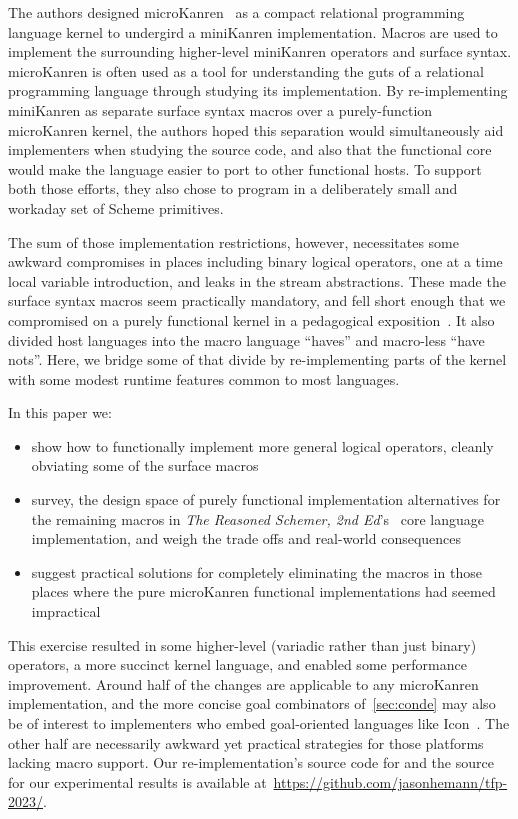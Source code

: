 \documentclass[sigplan,draft,balance,pbalance,natbib=false]{acmart}
\begin{document}
The authors designed microKanren~\cite{hemann2013muKanren} as a
compact relational programming language kernel to undergird a
miniKanren implementation. Macros are used to implement the
surrounding higher-level miniKanren operators and surface syntax.\@
microKanren is often used as a tool for understanding the guts of a
relational programming language through studying its implementation.
By re-implementing miniKanren as separate surface syntax macros over a
purely-function microKanren kernel, the authors hoped this separation
would simultaneously aid implementers when studying the source code,
and also that the functional core would make the language easier to
port to other functional hosts. To support both those efforts, they
also chose to program in a deliberately small and workaday set of
Scheme primitives.

The sum of those implementation restrictions, however, necessitates
some awkward compromises in places including binary logical operators,
one at a time local variable introduction, and leaks in the stream
abstractions. These made the surface syntax macros seem practically
mandatory, and fell short enough that we compromised on a purely
functional kernel in a pedagogical
exposition~\cite{friedman2018reasoned}. It also divided host languages
into the macro language \enquote{haves} and macro-less \enquote{have
  nots}. Here, we bridge some of that divide by re-implementing parts
of the kernel with some modest runtime features common to most
languages.

In this paper we:
%
\begin{itemize}

\item show how to functionally implement more general logical
  operators, cleanly obviating some of the surface macros

\item survey, the design space of purely functional implementation
  alternatives for the remaining macros in \emph{The Reasoned Schemer,
    2nd Ed}'s~\cite{friedman2018reasoned} core language
  implementation, and weigh the trade offs and real-world consequences

\item suggest practical solutions for completely eliminating the
  macros in those places where the pure microKanren functional
  implementations had seemed impractical

\end{itemize}

This exercise resulted in some higher-level (variadic rather than just
binary) operators, a more succinct kernel language, and enabled some
performance improvement. Around half of the changes are applicable to
any microKanren implementation, and the more concise goal combinators
of~\cref{sec:conde} may also be of interest to implementers who embed
goal-oriented languages like Icon~\cite{griswold1983icon}. The other
half are necessarily awkward yet practical strategies for those
platforms lacking macro support. Our re-implementation's source code
for and the source for our experimental results is available
at~\url{https://github.com/jasonhemann/tfp-2023/}.
\end{document}

